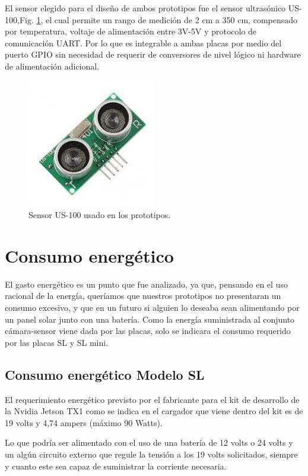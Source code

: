 El sensor elegido para el diseño de ambos prototipos fue el sensor ultrasónico US-100,Fig. \ref{fig:sensor-US100}, el cual permite un 
rango de medición de 2 cm a 350 cm, compensado por temperatura, voltaje de alimentación entre 3V-5V y protocolo de 
comunicación UART. Por lo que es integrable a ambas placas por medio del puerto GPIO sin necesidad de requerir de conversores de nivel lógico 
ni hardware de alimentación adicional.
\begin{figure}
    \centering
    \includegraphics[width=0.5\textwidth]{imgs/us-100.jpg}
    \caption{Sensor US-100 usado en los prototipos.}
    \label{fig:sensor-US100}
\end{figure}

\section{Consumo energético}

El gasto energético es un punto que fue analizado, ya que, pensando en el uso racional de la energía, queríamos que nuestros prototipos no
presentaran un consumo excesivo, y que en un futuro si alguien lo deseaba sean alimentando por un panel solar junto con una batería.
Como la energía suministrada al conjunto cámara-sensor viene dada por las placas, solo se indicara el consumo requerido por las placas SL y SL mini.
\subsection{Consumo energético Modelo SL}

El requerimiento energético previsto por el fabricante para el kit de desarrollo de la Nvidia Jetson TX1 como se indica 
en el cargador que viene dentro del kit es de 19 volts y 4,74 ampers (máximo 90 Watts).

Lo que podría ser alimentado con el uso de una batería de 12 volts o 24 volts y un algún circuito externo que regule la 
tensión a los 19 volts solicitados, siempre y cuanto este sea capaz de suministrar la corriente necesaria.

